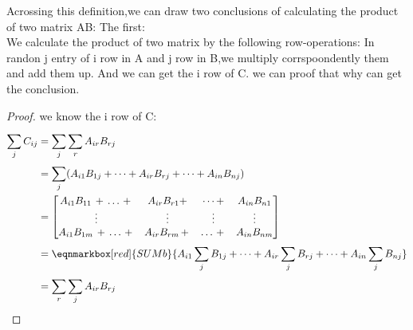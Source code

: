 \begin{remark}
	Acrossing this definition,we can draw two conclusions of calculating the product of two matrix AB:
	The first:\\
	We calculate the product of two matrix by the following row-operations:
	In randon j entry of i row in A and  j row in B,we multiply corrspoondently them and add them up. And we can get the i row of C.
	we can proof that why can get the conclusion.
	\begin{proof}
		we know the i row of C:\[
			\begin{aligned}[]
				\sum\limits_{j}^{}C_{ij} & = \sum\limits_{j}^{}\sum\limits_{r}^{}A_{ir}B_{rj}                                                                                         \\
				                         & =\sum\limits_{j}^{}(A_{i1}B_{1j}+\dots+A_{ir}B_{rj}+\dots+A_{in}B_{nj})                                                                    \\
				                         & = \begin{bmatrix}
					                             A_{i1}B_{11}\, +\, \dots\, +\, & A_{ir}B_{r1} +     & \dots +     & A_{in}B_{n1} \\
					                             \vdots                         & \vdots             & \vdots      & \vdots       \\
					                             A_{i1}B_{1m}\, +\, \dots\, +\, & A_{ir}B_{rm}\, +\, & \dots\, +\, & A_{in}B_{nm}
				                             \end{bmatrix}                                                         \\
				                         & = \eqnmarkbox[red]{SUMb}{A_{i1}\sum\limits_{j}^{}B_{1j} + \dots + A_{ir}\sum\limits_{j}^{}B_{rj} + \dots + A_{in}\sum\limits_{j}^{}B_{nj}} \\
				                         & = \sum\limits_{r}^{}\sum\limits_{j}^{}A_{ir}B_{rj}
			\end{aligned}
		\]
	\end{proof}

\end{remark}

